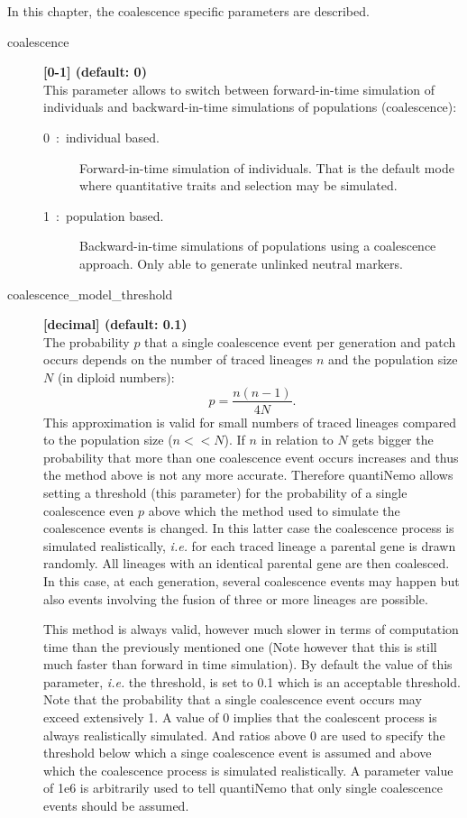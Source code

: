 \documentclass[letterpaper,12pt,oneside]{book}
\begin{document}
In this chapter, the coalescence specific parameters are described.

\begin{description}
\item[coalescence] \textbf{[0-1] (default: 0)}\\ 
This parameter allows to switch between forward-in-time simulation of individuals and backward-in-time simulations of populations (coalescence):
\begin{description}
\item[0~:~individual based.] Forward-in-time simulation of individuals. That is the default mode where quantitative traits and selection may be simulated. 
\item[1~:~population based.] Backward-in-time simulations of populations using a coalescence approach. Only able to generate unlinked neutral markers.
\end{description}

\item[coalescence\_model\_threshold] \textbf{[decimal] (default: 0.1)}\\ 
The probability $p$ that a single coalescence event per generation and patch occurs depends on the number of traced lineages $n$ and the population size $N$ (in diploid numbers):
    \[
    p = \frac{n(n-1)}{4N}.
\]  
This approximation is valid for small numbers of traced lineages compared to the population size ($n<<N$). If $n$ in relation to $N$ gets bigger the probability that more than one coalescence event occurs increases and thus the method above is not any more accurate. Therefore quantiNemo allows setting a threshold (this parameter) for the probability of a single coalescence even $p$ above which the method used to simulate the coalescence events is changed. In this latter case the coalescence process is simulated realistically, \textit{i.e.} for each traced lineage a parental gene is drawn randomly. All lineages with an identical parental gene are then coalesced. In this case, at each generation, several coalescence events may happen but also events involving the fusion of three or more lineages are possible. 

This method is always valid, however much slower in terms of computation time than the previously mentioned one (Note however that this is still much faster than forward in time simulation). By default the value of this parameter, \textit{i.e.} the threshold, is set to 0.1 which is an acceptable threshold. Note that the probability that a single coalescence event occurs may exceed extensively 1. A value of 0 implies that the coalescent process is always realistically simulated. And ratios above 0 are used to specify the threshold below which a singe coalescence event is assumed and above which the coalescence process is simulated realistically. A parameter value of 1e6 is arbitrarily used to tell quantiNemo that only single coalescence events should be assumed.    


\end{description}
\end{document}
